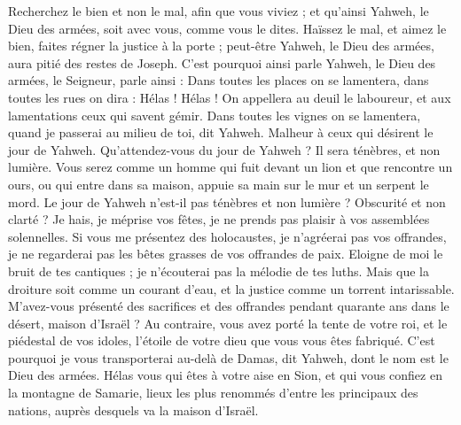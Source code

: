 \begin{multicols}{2}
Recherchez le bien et non le mal, afin que vous viviez ; et qu’ainsi Yahweh, le Dieu des armées, soit avec vous, comme vous le dites.
Haïssez le mal, et aimez le bien, faites régner la justice à la porte ; peut-être Yahweh, le Dieu des armées, aura pitié des restes de Joseph.
C'est pourquoi ainsi parle Yahweh, le Dieu des armées, le Seigneur, parle ainsi : Dans toutes les places on se lamentera, dans toutes les rues on dira : Hélas ! Hélas ! On appellera au deuil le laboureur, et aux lamentations ceux qui savent gémir.
Dans toutes les vignes on se lamentera, quand je passerai au milieu de toi, dit Yahweh.
Malheur à ceux qui désirent le jour de Yahweh. Qu’attendez-vous du jour de Yahweh ? Il sera ténèbres, et non lumière.
Vous serez comme un homme qui fuit devant un lion et que rencontre un ours, ou qui entre dans sa maison, appuie sa main sur le mur et un serpent le mord.
Le jour de Yahweh n’est-il pas ténèbres et non lumière ? Obscurité et non clarté ?
Je hais, je méprise vos fêtes, je ne prends pas plaisir à vos assemblées solennelles.
Si vous me présentez des holocaustes, je n’agréerai pas vos offrandes, je ne regarderai pas les bêtes grasses de vos offrandes de paix.
Eloigne de moi le bruit de tes cantiques ; je n’écouterai pas la mélodie de tes luths.
Mais que la droiture soit comme un courant d’eau, et la justice comme un torrent intarissable.
M’avez-vous présenté des sacrifices et des offrandes pendant quarante ans dans le désert, maison d'Israël ?
Au contraire, vous avez porté la tente de votre roi, et le piédestal de vos idoles, l'étoile de votre dieu que vous vous êtes fabriqué.
C'est pourquoi je vous transporterai au-delà de Damas, dit Yahweh, dont le nom est le Dieu des armées.
\VerseOne{}Hélas vous qui êtes à votre aise en Sion, et qui vous confiez en la montagne de Samarie, lieux les plus renommés d’entre les principaux des nations, auprès desquels va la maison d'Israël.

\end{multicols}
